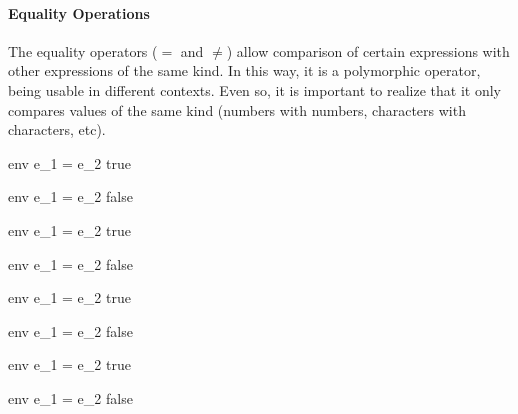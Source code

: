 \documentclass{article}
\begin{document}
\paragraph{Equality Operations}
The equality operators ($=$ and $\neq$) allow comparison of certain expressions with other expressions of the same kind.
In this way, it is a polymorphic operator, being usable in different contexts.
Even so, it is important to realize that it only compares values of the same kind (numbers with numbers, characters with characters, etc).

\medskip

    {\mbox{env} \vdash e_1 = e_2 \Downarrow true}

    {\mbox{env} \vdash e_1 = e_2 \Downarrow false}

\medskip

    {\mbox{env} \vdash e_1 = e_2 \Downarrow true}

    {\mbox{env} \vdash e_1 = e_2 \Downarrow false}

\medskip

    {\mbox{env} \vdash e_1 = e_2 \Downarrow true}

    {\mbox{env} \vdash e_1 = e_2 \Downarrow false}

\medskip

    {\mbox{env} \vdash e_1 = e_2 \Downarrow true}

    {\mbox{env} \vdash e_1 = e_2 \Downarrow false}
\end{document}
